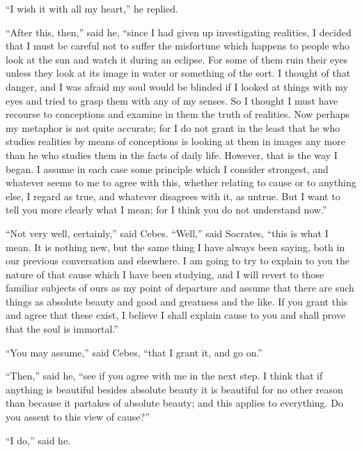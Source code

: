 \documentclass[letterpaper,12pt]{article}
\newcommand{\stephpag}[1]{\marginnote{\small\itshape\fontfamily{ppl}\selectfont #1}}
\begin{document}
\begin{drama}
``I wish it with all my heart,'' he replied.
 
``After this, then,'' said he, ``since I had given up investigating realities, I decided that I must be careful not to suffer the misfortune which happens to people who look at the sun and watch it during an eclipse. For some of them ruin their eyes unless they look at its image in water \stephpag{e} or something of the sort. I thought of that danger, and I was afraid my soul would be blinded if I looked at things with my eyes and tried to grasp them with any of my senses. So I thought I must have recourse to conceptions and examine in them the truth of realities. Now perhaps my metaphor \stephpag{100 a} is not quite accurate; for I do not grant in the least that he who studies realities by means of conceptions is looking at them in images any more than he who studies them in the facts of daily life. However, that is the way I began. I assume in each case some principle which I consider strongest, and whatever seems to me to agree with this, whether relating to cause or to anything else, I regard as true, and whatever disagrees with it, as untrue. But I want to tell you more clearly what I mean; for I think you do not understand now.''
 
``Not very well, certainly,'' said Cebes. \stephpag{b} ``Well,'' said Socrates, ``this is what I mean. It is nothing new, but the same thing I have always been saying, both in our previous conversation and elsewhere. I am going to try to explain to you the nature of that cause which I have been studying, and I will revert to those familiar subjects of ours as my point of departure and assume that there are such things as absolute beauty and good and greatness and the like. If you grant this and agree that these exist, I believe I shall explain cause to you and shall prove that \stephpag{c} the soul is immortal.''
 
``You may assume,'' said Cebes, ``that I grant it, and go on.''
 
``Then,'' said he, ``see if you agree with me in the next step. I think that if anything is beautiful besides absolute beauty it is beautiful for no other reason than because it partakes of absolute beauty; and this applies to everything. Do you assent to this view of cause?''
 
``I do,'' said he.
 

\end{drama}
\end{document}
